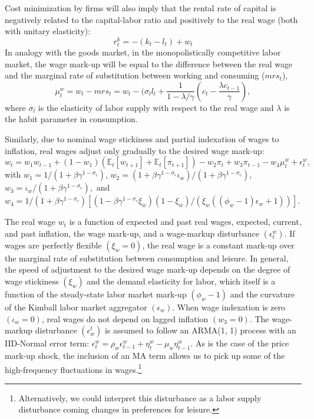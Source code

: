 \documentclass[11pt]{article}
\newcommand{\E}{\mathbb{E}}
\newcommand{\cobs}[1]{c_{#1}}
\newcommand{\wobs}[1]{w_{#1}}
\newcommand{\lobs}[1]{l_{#1}}
\newcommand{\piobs}[1]{\pi_{#1}}
\newcommand{\consumption}{consumption}
\newcommand{\labor}{labor}
\newcommand{\wage}{wage}
\newcommand{\wages}{wages}
\newcommand{\price}{price}
\newcommand{\inflation}{inflation}
\newcommand{\working}{working}
\newcommand{\consuming}{consuming}
\newcommand{\leisure}{leisure}
\begin{document}
Cost minimization by firms will also imply that the rental rate of
capital is negatively related to the capital-\labor{} ratio and
positively to the real \wage{} (both with unitary elasticity):
\begin{equation}
  \label{eq:11}
  r_t^k = -(k_t - \lobs{t}) + \wobs{t}
\end{equation} In analogy with the goods market, in the monopolistically
competitive \labor{} market, the \wage{} mark-up will be equal to the
difference between the real \wage{} and the marginal rate of
substitution between \working{} and \consuming{} (\(mrs_t\)),
\begin{equation}
  \label{eq:12}
  \mu_t^w = \wobs{t} - mrs_t = \wobs{t} - (\sigma_l\lobs{t} +
  \frac{1}{1-\lambda/\gamma} \left(\cobs{t} - \frac{\lambda\cobs{t-1}}{\gamma}\right),
\end{equation} where \(\sigma_l\) is the elasticity of \labor{} supply
with respect to the real \wage{} and \(\lambda\) is the habit parameter
in \consumption.

Similarly, due to nominal \wage{} stickiness and partial indexation of
\wages{} to \inflation, real \wages{} adjust only gradually to the
desired \wage{} mark-up: \begin{equation}
  \label{eq:13}
  \wobs{t} = w_1\wobs{t-1} + (1- w_1)(\E_t[\wobs{t+1}] +
  \E_t[\piobs{t+1}]) - w_2 \piobs{t} + w_3 \piobs{t-1} - w_4 \mu_t^w + \epsilon_t^w,
\end{equation} with \(w_1 = 1/(1+\beta\gamma^{1-\sigma_c})\),
\(w_2= (1+\beta\gamma^{1-\sigma_c}\iota_w) / (1+\beta\gamma^{1-\sigma_c})\),
\(w_3 = \iota_w / (1+\beta\gamma^{1-\sigma_c}),\) and
\(w_4 = 1/ (1+\beta\gamma^{1-\sigma_c}) [(1-\beta\gamma^{1-\sigma_c}\xi_w)(1-\xi_w) / (\xi_w((\phi_w-1)\epsilon_w + 1))]\).

The real \wage{} \(\wobs{t}\) is a function of expected and past real
\wages, expected, current, and past \inflation, the \wage{} mark-up, and
a \wage-markup disturbance \((\epsilon^w_t)\). If \wages{} are perfectly
flexible \((\xi_w = 0)\), the real \wage{} is a constant mark-up over
the marginal rate of substitution between \consumption{} and \leisure{}.
In general, the speed of adjustment to the desired \wage{} mark-up
depends on the degree of \wage{} stickiness \((\xi_w)\) and the demand
elasticity for \labor, which itself is a function of the steady-state
\labor{} market mark-up \((\phi_w - 1)\) and the curvature of the
Kimball \labor{} market aggregator \((\epsilon_w)\). When \wage{}
indexation is zero \((\iota_w =0)\), real \wages{} do not depend on
lagged \inflation{} \((w_3 = 0)\). The \wage{}-markup disturbance
\((\epsilon_w^t)\) is assumed to follow an ARMA(1, 1) process with an
IID-Normal error term:
\(\epsilon_t^w = \rho_w \epsilon_{t-1}^w + \eta_t^w - \mu_w \eta_{t-1}^w\).
As is the case of the \price{} mark-up shock, the inclusion of an MA
term allows us to pick up some of the high-frequency fluctuations in
\wages{}.\footnote{Alternatively, we
  could interpret this disturbance as a \labor{} supply disturbance
  coming changes in preferences for \leisure{}.}
\end{document}
